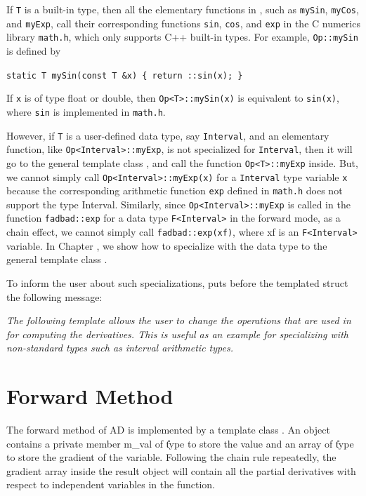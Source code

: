If {\tt T} is a built-in type, then all the elementary functions in \Op, such as {\tt mySin},  {\tt myCos}, and {\tt myExp}, call their corresponding functions {\tt sin},  {\tt cos}, and {\tt exp} in the C numerics library {\tt math.h}, which only supports C++ built-in types. 
For example, {\tt Op::mySin} is defined by

\texttt{static T mySin(const T \&x) \{ return ::sin(x); \}}

\noindent If {\tt x} is of type float or double, then {\tt Op<T>::mySin(x)}
is equivalent to {\tt sin(x)}, where {\tt sin} is implemented in {\tt math.h}.

However, if {\tt T} is a user-defined data type, say {\tt Interval}, and an elementary function, like {\tt Op<Interval>::myExp}, is not specialized for {\tt Interval}, then it will go to the general template class \Op, and call the function {\tt Op<T>::myExp} inside. But, we cannot simply call {\tt Op<Interval>::myExp(x)} for a {\tt Interval} type variable {\tt x} because the corresponding arithmetic function {\tt exp} defined in {\tt math.h} does not support the type Interval. Similarly, since {\tt Op<Interval>::myExp} is called in the function {\tt fadbad::exp} for a data type {\tt F<Interval>} in the forward mode, as a chain effect, we cannot simply call {\tt fadbad::exp(xf)}, where xf is an {\tt F<Interval>} variable. In Chapter , we show how to specialize with the data type \mpreal to the general template class \Op. 

To inform the user about such specializations, \fadbad puts before the templated struct \Op the following message:

{\em The following template allows the user to change the operations that are used in \FADBADpp for computing the derivatives. This is useful as an example for specializing with non-standard types such as interval arithmetic types.}


\section{Forward Method}\label{sc:fadbadforwardmode}
The forward method of AD is implemented by a template class \Fn. An \F object contains a private member m\_val of \U type to store the value and an array of \U type to store the gradient of the variable. Following the chain rule repeatedly, the gradient array inside the result \F object will contain all the partial derivatives with respect to independent variables in the function.

